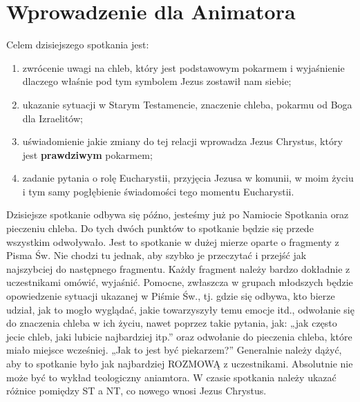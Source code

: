 \documentclass[a5paper,10pt,polish]{book}
\begin{document}
\section{Wprowadzenie dla Animatora}
\label{babice2006-jesien-knurow/spotkanie2:wprowadzenie-dla-animatora}
Celem dzisiejszego spotkania jest:
\begin{enumerate}
\item {} 
zwrócenie uwagi na chleb, który jest podstawowym pokarmem i wyjaśnienie dlaczego właśnie pod tym symbolem Jezus zostawił nam siebie;

\item {} 
ukazanie sytuacji w Starym Testamencie, znaczenie chleba, pokarmu od Boga dla Izraelitów;

\item {} 
uświadomienie jakie zmiany do tej relacji wprowadza Jezus Chrystus, który jest \textbf{prawdziwym} pokarmem;

\item {} 
zadanie pytania o rolę Eucharystii, przyjęcia Jezusa w komunii, w moim życiu i tym samy pogłębienie świadomości tego momentu Eucharystii.

\end{enumerate}

Dzisiejsze spotkanie odbywa się późno, jesteśmy już po Namiocie Spotkania oraz pieczeniu chleba. Do tych dwóch punktów to spotkanie będzie się przede wszystkim odwoływało. Jest to spotkanie w dużej mierze oparte o fragmenty z Pisma Św. Nie chodzi tu jednak, aby szybko je przeczytać i przejść jak najszybciej do następnego fragmentu. Każdy fragment należy bardzo dokładnie z uczestnikami omówić, wyjaśnić. Pomocne, zwłaszcza w grupach młodszych będzie opowiedzenie sytuacji ukazanej w Piśmie Św., tj. gdzie się odbywa, kto bierze udział, jak to mogło wyglądać, jakie towarzyszyły temu emocje itd., odwołanie się do znaczenia chleba w ich życiu, nawet poprzez takie pytania, jak: „jak często jecie chleb, jaki lubicie najbardziej itp.” oraz odwołanie do pieczenia chleba, które miało miejsce wcześniej. „Jak to jest być piekarzem?” Generalnie należy dążyć, aby to spotkanie było jak najbardziej ROZMOWĄ z uczestnikami. Absolutnie nie może być to wykład teologiczny aniamtora. W czasie spotkania należy ukazać różnice pomiędzy ST a NT, co nowego wnosi Jezus Chrystus.
\end{document}
